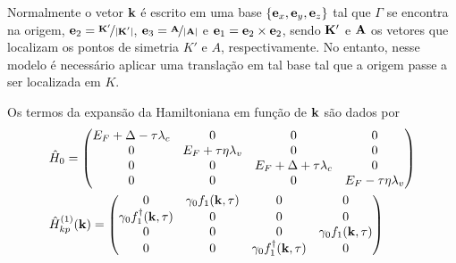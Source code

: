 Normalmente o vetor $ \mathbf{k} $ é escrito em uma base $ \{\mathbf{e}_x,\mathbf{e}_y,\mathbf{e}_z\} $
tal que $\Gamma$ se encontra na origem,
$ \mathbf{e}_2 = \nicefrac{\mathbf{K}'}{|\mathbf{K}'|} $, 
$ \mathbf{e}_3 = \nicefrac{\mathbf{A}}{|\mathbf{A}|} $ e 
$ \mathbf{e}_1 = \mathbf{e}_2 \times \mathbf{e}_2 $, sendo 
$ \mathbf{K}' $ e $ \mathbf{A} $ os vetores que localizam os pontos de simetria $K'$ e $A$, respectivamente.
No entanto, nesse modelo é necessário aplicar uma translação em tal base tal que
a origem passe a ser localizada em $K$.

Os termos da expansão da Hamiltoniana em função de $ \mathbf{k} $ são dados por
\begin{align}
  \begin{split}
    &\hat{H}_0 =
    \left(
    \begin{matrix}
        E_F + \Delta - \tau \lambda_c & 0                         & 0                             & 0                         \\
        0                             & E_F + \tau \eta \lambda_v & 0                             & 0                         \\
        0                             & 0                         & E_F + \Delta + \tau \lambda_c & 0                         \\
        0                             & 0                         & 0                             & E_F - \tau \eta \lambda_v \\
      \end{matrix}
    \right) \\
    &\hat{H}_{kp}^{(1)}(\bvec{k}) =
    \left(
    \begin{matrix}
        0                                     & \gamma_0 f_1(\bvec{k},\tau) & 0                                     & 0                           \\
        \gamma_0 f_1^{\dagger}(\bvec{k},\tau) & 0                           & 0                                     & 0                           \\
        0                                     & 0                           & 0                                     & \gamma_0 f_1(\bvec{k},\tau) \\
        0                                     & 0                           & \gamma_0 f_1^{\dagger}(\bvec{k},\tau) & 0                           \\
      \end{matrix}
    \right) \\

\end{split}
\end{align}
